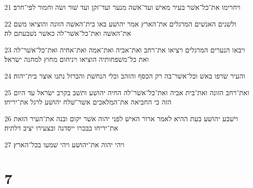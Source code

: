 \par 21 ויחרימו את־כל־אשׁר בעיר מאישׁ ועד־אשׁה מנער ועד־זקן ועד שׁור ושׂה וחמור לפי־חרב׃
\par 22 ולשׁנים האנשׁים המרגלים את־הארץ אמר יהושׁע באו בית־האשׁה הזונה והוציאו משׁם את־האשׁה ואת־כל־אשׁר־לה כאשׁר נשׁבעתם לה׃
\par 23 ויבאו הנערים המרגלים ויציאו את־רחב ואת־אביה ואת־אמה ואת־אחיה ואת־כל־אשׁר־לה ואת כל־משׁפחותיה הוציאו ויניחום מחוץ למחנה ישׂראל׃
\par 24 והעיר שׂרפו באשׁ וכל־אשׁר־בה רק הכסף והזהב וכלי הנחשׁת והברזל נתנו אוצר בית־יהוה׃
\par 25 ואת־רחב הזונה ואת־בית אביה ואת־כל־אשׁר־לה החיה יהושׁע ותשׁב בקרב ישׂראל עד היום הזה כי החביאה את־המלאכים אשׁר־שׁלח יהושׁע לרגל את־יריחו׃
\par 26 וישׁבע יהושׁע בעת ההיא לאמר ארור האישׁ לפני יהוה אשׁר יקום ובנה את־העיר הזאת את־יריחו בבכרו ייסדנה ובצעירו יציב דלתיה׃
\par 27 ויהי יהוה את־יהושׁע ויהי שׁמעו בכל־הארץ׃

\chapter{7}

